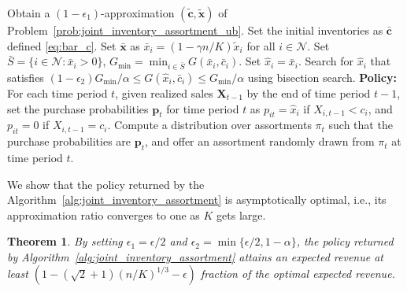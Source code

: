 \documentclass[mnsc,non-blindrev]{informs3}
\newtheorem{theorem}{Theorem}[section]
\theoremstyle{definition}
\begin{document}
\begin{appendices}{\Large{}}
{\begin{algorithm}[t]
\SingleSpacedXI
\caption{Asymptotically Optimal Algorithm for Joint Inventory Stocking and Dynamic Assortment Optimization}
\label{alg:joint_inventory_assortment}
\begin{algorithmic}
\State Obtain a $(1-\epsilon_1)$-approximation $(\tilde{\bm{c}},\tilde{\bm{x}})$ of Problem~\eqref{prob:joint_inventory_assortment_ub}.
\State Set the initial inventories as $\bar{\bm{c}}$ defined \eqref{eq:bar_c}.
\State Set $\bar{\bm{x}}$ as $\bar{x}_i=(1-\gamma n/K)\tilde{x}_i$ for all $i\in\mathcal{N}$.
\State Set $\bar{S}=\{i\in\mathcal{N}:\bar{x}_i>0\}$, $G_{\min}=\min_{i\in\bar{S}} G(\bar{x}_i,\bar{c}_i)$.
\State Set $\hat{x}_i=\bar{x}_i$.
\Else
\State Search for $\hat{x}_i$ that satisfies $(1-\epsilon_2)G_{\min}/\alpha\leq G(\hat{x}_i,\bar{c}_i)\leq G_{\min}/\alpha$ using bisection search.
\EndIf
\EndFor
\State \textbf{Policy:} For each time period $t$, given realized sales $\bm{X}_{t-1}$ by the end of time period $t-1$, set the purchase probabilities $\bm{p}_t$ for time period $t$ as $p_{it}=\hat{x}_i$ if $X_{i,t-1}<c_i$, and $p_{it}=0$ if $X_{i,t-1}=c_i$. Compute a distribution over assortments $\pi_t$ such that the purchase probabilities are $\bm{p}_t$, and offer an assortment randomly drawn from $\pi_t$ at time period $t$.
\end{algorithmic}
\end{algorithm}

We show that the policy returned by the Algorithm~\ref{alg:joint_inventory_assortment} is asymptotically optimal, i.e., its approximation ratio converges to one as $K$ gets large.

\begin{theorem}
By setting $\epsilon_1=\epsilon/2$ and $\epsilon_2=\min\{\epsilon/2,1-\alpha\}$, the policy returned by Algorithm~\ref{alg:joint_inventory_assortment} attains an expected revenue at least $(1-(\sqrt{2}+1)(n/K)^{1/3}-\epsilon)$ fraction of the optimal expected revenue.
\end{theorem}

}
\end{appendices}
\end{document}
